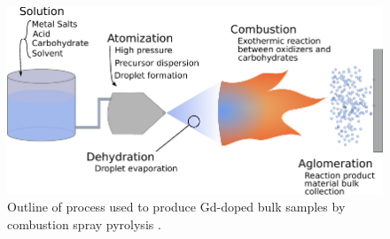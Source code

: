

\begin{figure}
    \centering
    \includegraphics{Figures/Combustion_Spray_Pyrolysis-2.pdf}
    \caption{Outline of process used to produce Gd-doped bulk samples by combustion spray pyrolysis \cite{Praxair2019}.}
    \label{fig:CSP}
\end{figure}

